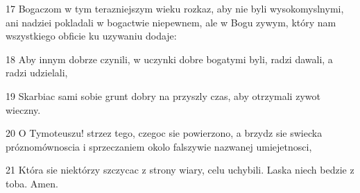 \par 17 Bogaczom w tym terazniejszym wieku rozkaz, aby nie byli wysokomyslnymi, ani nadziei pokladali w bogactwie niepewnem, ale w Bogu zywym, który nam wszystkiego obficie ku uzywaniu dodaje:
\par 18 Aby innym dobrze czynili, w uczynki dobre bogatymi byli, radzi dawali, a radzi udzielali,
\par 19 Skarbiac sami sobie grunt dobry na przyszly czas, aby otrzymali zywot wieczny.
\par 20 O Tymoteuszu! strzez tego, czegoc sie powierzono, a brzydz sie swiecka próznomównoscia i sprzeczaniem okolo falszywie nazwanej umiejetnosci,
\par 21 Która sie niektórzy szczycac z strony wiary, celu uchybili. Laska niech bedzie z toba. Amen.


